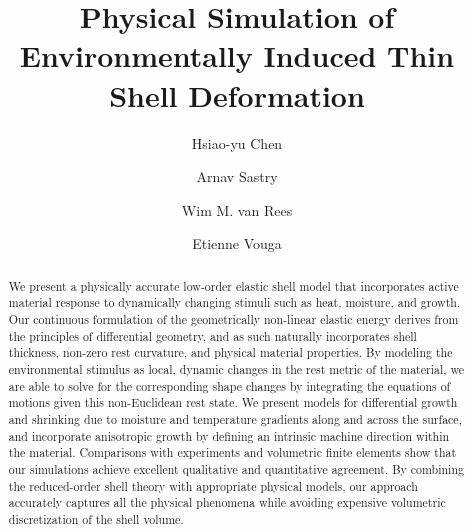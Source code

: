 \documentclass[timestamp,acmtog]{acmart}
\begin{document}
\title{Physical Simulation of Environmentally Induced Thin Shell Deformation}

\author{Hsiao-yu Chen}

  \author{Arnav Sastry}
  
  \author{Wim M. van Rees}

\author{Etienne Vouga}


\begin{abstract}
We present a physically accurate low-order elastic shell model that incorporates active material response to dynamically changing stimuli such as heat, moisture, and growth. Our continuous formulation of the geometrically non-linear elastic energy derives from the principles of differential geometry, and as such naturally incorporates shell thickness, non-zero rest curvature, and physical material properties. By modeling the environmental stimulus as local, dynamic changes in the rest metric of the material, we are able to solve for the corresponding shape changes by integrating the equations of motions given this non-Euclidean rest state. We present models for differential growth and shrinking due to moisture and temperature gradients along and across the surface, and incorporate anisotropic growth by defining an intrinsic machine direction within the material. Comparisons with experiments and volumetric finite elements show that our simulations achieve excellent qualitative and quantitative agreement. By combining the reduced-order shell theory with appropriate physical models, our approach accurately captures all the physical phenomena while avoiding expensive volumetric discretization of the shell volume. 
\end{abstract}
\end{document}
